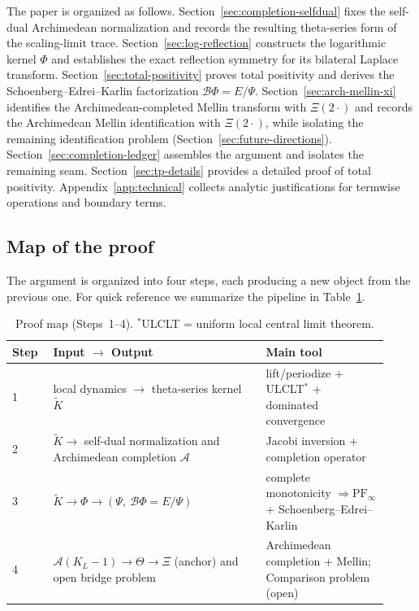 \documentclass[12pt]{amsart}
\theoremstyle{definition}
\theoremstyle{remark}
\begin{document}
The paper is organized as follows. Section~\ref{sec:completion-selfdual} fixes the self-dual Archimedean normalization and records the resulting theta-series form of the scaling-limit trace. Section~\ref{sec:log-reflection} constructs the logarithmic kernel $\Phi$ and establishes the exact reflection symmetry for its bilateral Laplace transform. Section~\ref{sec:total-positivity} proves total positivity and derives the Schoenberg--Edrei--Karlin factorization $\mathcal B\Phi=E/\Psi$. Section~\ref{sec:arch-mellin-xi} identifies the Archimedean-completed Mellin transform with $\Xi(2\cdot)$ and records the Archimedean Mellin identification with $\Xi(2\cdot)$, while isolating the remaining identification problem (Section~\ref{sec:future-directions}). Section~\ref{sec:completion-ledger} assembles the argument and isolates the remaining seam. Section~\ref{sec:tp-details} provides a detailed proof of total positivity. Appendix~\ref{app:technical} collects analytic justifications for termwise operations and boundary terms.

\subsection{Map of the proof}\label{subsec:map-proof}
The argument is organized into four steps, each producing a new object from the previous one.
For quick reference we summarize the pipeline in Table~\ref{tab:proof-map}.

\begin{table}[h!]
\centering
\setlength{\arrayrulewidth}{0.8pt}
\renewcommand{\arraystretch}{1.25}

\begin{tabular}{|p{0.10\linewidth}|p{0.52\linewidth}|p{0.30\linewidth}|}
\hline
\textbf{Step} & \textbf{Input $\to$ Output} & \textbf{Main tool} \\
\hline
1 &
local dynamics $\to$ theta-series kernel $\widetilde K$ &
lift/periodize + ULCLT$^*$
+ dominated convergence
\\ \hline
2 &
$\widetilde K \to$ self-dual normalization and Archimedean completion $\mathcal A$ &
Jacobi inversion + completion operator
\\ \hline
3 &
$\widetilde K \to \Phi \to (\Psi,\ \mathcal B\Phi=E/\Psi)$ &
complete monotonicity $\Rightarrow \mathrm{PF}_\infty$ +
Schoenberg--Edrei--Karlin
\\ \hline
4 &
$\mathcal A(K_L-1)\to \Theta \to \Xi$ (anchor) and open bridge problem &
Archimedean completion + Mellin;
Comparison problem (open)
\\ \hline
\end{tabular}

\caption{Proof map (Steps~1--4). $^*$ULCLT = uniform local central limit theorem.}
\label{tab:proof-map}
\end{table}
\end{document}
